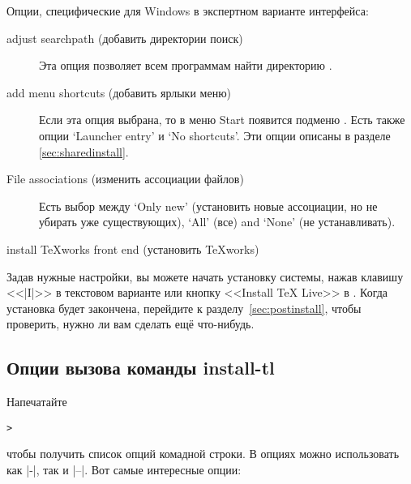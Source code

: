 \documentclass{article}
\begin{document}
Опции, специфические для Windows в экспертном варианте интерфейса: 
\begin{description}
\item[adjust searchpath (добавить директории поиск)]
  Эта опция позволяет всем программам найти директорию \TL.

\item[add menu shortcuts (добавить ярлыки меню)] Если эта опция
  выбрана, то в меню Start появится подменю \TL{}. Есть также опции
  `Launcher entry' и `No shortcuts'. Эти опции описаны в разделе
  \ref{sec:sharedinstall}.

\item[File associations (изменить ассоциации файлов)] Есть
  выбор между  `Only new' (установить новые ассоциации, но не убирать
  уже существующих), `All' (все) and
  `None' (не устанавливать).

\item[install \TeX{}works front end (установить \TeX{}works)]
\end{description}


Задав нужные настройки, вы можете начать установку системы, нажав
клавишу <<|I|>> в текстовом варианте или кнопку <<Install TeX Live>> в
\GUI.  Когда установка будет закончена, перейдите к
разделу~\ref{sec:postinstall}, чтобы проверить, нужно ли вам сделать
ещё что-нибудь.

\subsection{Опции вызова команды install-tl}
\label{sec:cmdline}

Напечатайте
\begin{alltt}
> 
\end{alltt}
чтобы получить список опций комадной строки.  В опциях можно
использовать как |-|, так и |--|.  Вот самые интересные опции:
\end{document}
